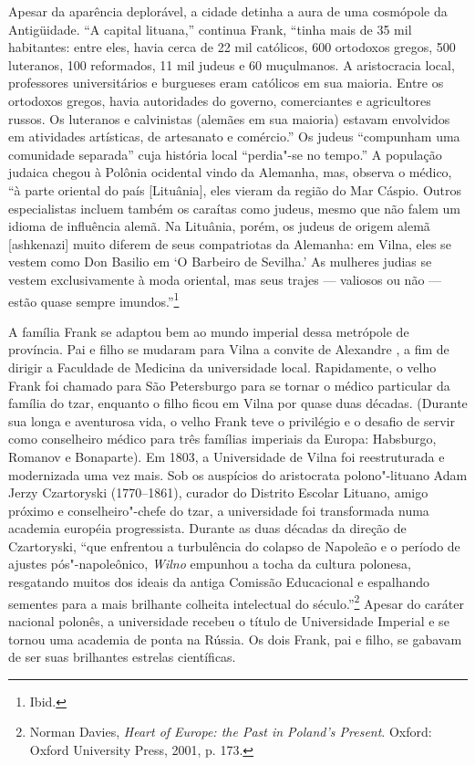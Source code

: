 Apesar da aparência deplorável, a cidade detinha a aura de uma cosmópole
da Antigüidade. ``A capital lituana,'' continua Frank, ``tinha mais de
35 mil habitantes: entre eles, havia cerca de 22 mil católicos, 600
ortodoxos gregos, 500 luteranos, 100 reformados, 11 mil judeus e 60
muçulmanos. A aristocracia local, professores universitários e burgueses
eram católicos em sua maioria. Entre os ortodoxos gregos, havia
autoridades do governo, comerciantes e agricultores russos. Os luteranos
e calvinistas (alemães em sua maioria) estavam envolvidos em atividades
artísticas, de artesanato e comércio.'' Os judeus ``compunham uma
comunidade separada'' cuja história local ``perdia"-se no tempo.'' A
população judaica chegou à Polônia ocidental vindo da Alemanha, mas,
observa o médico, ``à parte oriental do país {[}Lituânia{]}, eles vieram
da região do Mar Cáspio. Outros especialistas incluem também os caraítas
como judeus, mesmo que não falem um idioma de influência alemã. Na
Lituânia, porém, os judeus de origem alemã {[}ashkenazi{]} muito diferem
de seus compatriotas da Alemanha: em Vilna, eles se vestem como Don
Basilio em `O Barbeiro de Sevilha.' As mulheres judias se vestem
exclusivamente à moda oriental, mas seus trajes --- valiosos ou não ---
estão quase sempre imundos.''\footnote{Ibid.}

A família Frank se adaptou bem ao mundo imperial dessa metrópole de
província. Pai e filho se mudaram para Vilna a convite de Alexandre , a
fim de dirigir a Faculdade de Medicina da universidade local.
Rapidamente, o velho Frank foi chamado para São Petersburgo para se
tornar o médico particular da família do tzar, enquanto o filho ficou em
Vilna por quase duas décadas. (Durante sua longa e aventurosa vida, o
velho Frank teve o privilégio e o desafio de servir como conselheiro
médico para três famílias imperiais da Europa: Habsburgo, Romanov e
Bonaparte). Em 1803, a Universidade de Vilna foi reestruturada e
modernizada uma vez mais. Sob os auspícios do aristocrata polono"-lituano
Adam Jerzy Czartoryski (1770--1861), curador do Distrito Escolar Lituano,
amigo próximo e conselheiro"-chefe do tzar, a universidade foi
transformada numa academia européia progressista. Durante as duas
décadas da direção de Czartoryski, ``que enfrentou a turbulência do
colapso de Napoleão e o período de ajustes pós"-napoleônico, \emph{Wilno}
empunhou a tocha da cultura polonesa, resgatando muitos dos ideais da
antiga Comissão Educacional e espalhando sementes para a mais brilhante
colheita intelectual do século.''\footnote{Norman Davies, \emph{Heart of
  Europe: the Past in Poland's Present}. Oxford: Oxford University
  Press, 2001, p. 173.} Apesar do caráter nacional polonês, a
universidade recebeu o título de Universidade Imperial e se tornou uma
academia de ponta na Rússia. Os dois Frank, pai e filho, se gabavam de
ser suas brilhantes estrelas científicas.


